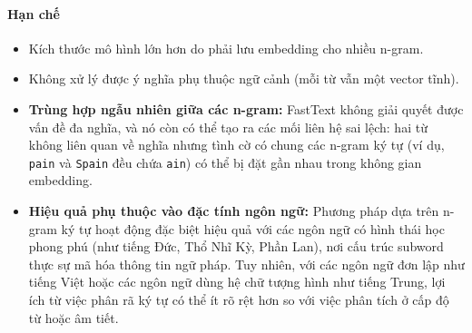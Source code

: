 \paragraph{Hạn chế}
\begin{itemize}
    \item Kích thước mô hình lớn hơn do phải lưu embedding cho nhiều n-gram.
    \item Không xử lý được ý nghĩa phụ thuộc ngữ cảnh (mỗi từ vẫn một vector tĩnh).
    \item \textbf{Trùng hợp ngẫu nhiên giữa các n-gram:} FastText không giải quyết được vấn đề đa nghĩa, và nó còn có thể tạo ra các mối liên hệ sai lệch: hai từ không liên quan về nghĩa nhưng tình cờ có chung các n-gram ký tự (ví dụ, \texttt{pain} và \texttt{Spain} đều chứa \texttt{ain}) có thể bị đặt gần nhau trong không gian embedding.

    \item \textbf{Hiệu quả phụ thuộc vào đặc tính ngôn ngữ:} Phương pháp dựa trên n-gram ký tự hoạt động đặc biệt hiệu quả với các ngôn ngữ có hình thái học phong phú (như tiếng Đức, Thổ Nhĩ Kỳ, Phần Lan), nơi cấu trúc subword thực sự mã hóa thông tin ngữ pháp. Tuy nhiên, với các ngôn ngữ đơn lập như tiếng Việt hoặc các ngôn ngữ dùng hệ chữ tượng hình như tiếng Trung, lợi ích từ việc phân rã ký tự có thể ít rõ rệt hơn so với việc phân tích ở cấp độ từ hoặc âm tiết.
\end{itemize}

